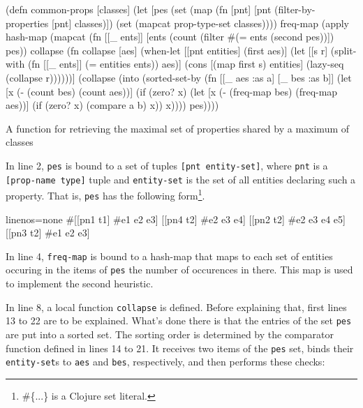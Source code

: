 \documentclass[submission]{eptcs}
\begin{document}
\begin{listing}[h!]
  \begin{clojurecode}
(defn common-props [classes]
  (let [pes (set (map (fn [pnt] [pnt (filter-by-properties [pnt] classes)])
                      (set (mapcat prop-type-set classes))))
        freq-map (apply hash-map
                        (mapcat (fn [[_ ents]] [ents (count (filter #(= ents (second %
                                                                    pes))])
                                pes))
        collapse (fn collapse [aes]
                   (when-let [[pnt entities] (first aes)]
                     (let [[s r] (split-with (fn [[_ ents]] (= entities ents)) aes)]
                       (cons [(map first s) entities]
                             (lazy-seq (collapse r))))))]
    (collapse (into (sorted-set-by
                     (fn [[_ aes :as a] [_ bes :as b]]
                       (let [x (- (count bes) (count aes))]
                         (if (zero? x)
                           (let [x (- (freq-map bes) (freq-map aes))]
                             (if (zero? x)
                               (compare a b)
                               x))
                           x))))
                    pes))))
  \end{clojurecode}
  \caption{A function for retrieving the maximal set of properties shared by a
    maximum of classes}
  \label{lst:common-props}
\end{listing}

In line 2, \verb|pes| is bound to a set of tuples \verb|[pnt entity-set]|,
where \verb|pnt| is a \verb|[prop-name type]| tuple and \verb|entity-set| is
the set of all entities declaring such a property.  That is, \verb|pes| has the
following form\footnote{\textsf{\#\{...\} is a Clojure set literal.}}.

\begin{clojurecode*}{linenos=none}
#{[[pn1 t1] #{e1 e2 e3}]     [[pn4 t2] #{e2 e3 e4}]
  [[pn2 t2] #{e2 e3 e4 e5}]  [[pn3 t2] #{e1 e2 e3}]}
\end{clojurecode*}

In line 4, \verb|freq-map| is bound to a hash-map that maps to each set of
entities occuring in the items of \verb|pes| the number of occurences in there.
This map is used to implement the second heuristic.

In line 8, a local function \verb|collapse| is defined.  Before explaining
that, first lines 13 to 22 are to be explained.  What's done there is that the
entries of the set \verb|pes| are put into a sorted set.  The sorting order is
determined by the comparator function defined in lines 14 to 21.  It receives
two items of the \verb|pes| set, binds their \verb|entity-set|s to \verb|aes|
and \verb|bes|, respectively, and then performs these checks:
\end{document}
